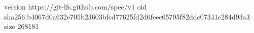 version https://git-lfs.github.com/spec/v1
oid sha256:b4067d0a632e705b23603bfcd77625fd2d6feec65795f82ddc07341c284d93a3
size 268181
